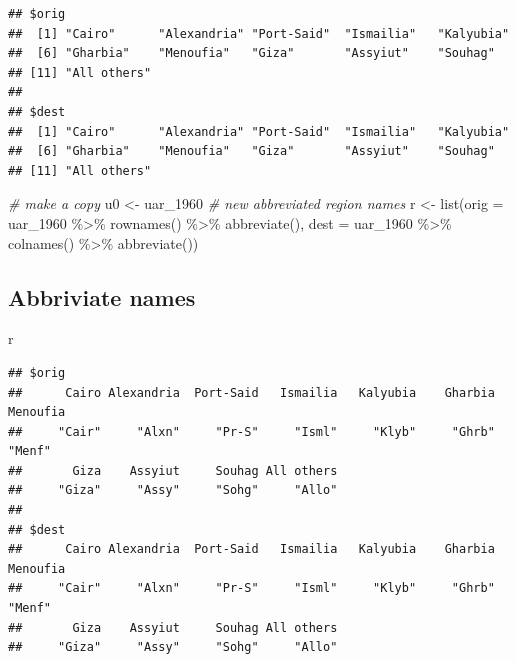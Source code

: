 \documentclass[
]{book}
\newenvironment{Shaded}{\begin{snugshade}}{\end{snugshade}}
\newcommand{\AttributeTok}[1]{\textcolor[rgb]{0.77,0.63,0.00}{#1}}
\newcommand{\CommentTok}[1]{\textcolor[rgb]{0.56,0.35,0.01}{\textit{#1}}}
\newcommand{\FunctionTok}[1]{\textcolor[rgb]{0.00,0.00,0.00}{#1}}
\newcommand{\NormalTok}[1]{#1}
\newcommand{\OtherTok}[1]{\textcolor[rgb]{0.56,0.35,0.01}{#1}}
\newcommand{\SpecialCharTok}[1]{\textcolor[rgb]{0.00,0.00,0.00}{#1}}
\begin{document}
\begin{verbatim}
## $orig
##  [1] "Cairo"      "Alexandria" "Port-Said"  "Ismailia"   "Kalyubia"  
##  [6] "Gharbia"    "Menoufia"   "Giza"       "Assyiut"    "Souhag"    
## [11] "All others"
## 
## $dest
##  [1] "Cairo"      "Alexandria" "Port-Said"  "Ismailia"   "Kalyubia"  
##  [6] "Gharbia"    "Menoufia"   "Giza"       "Assyiut"    "Souhag"    
## [11] "All others"
\end{verbatim}

\begin{Shaded}
\begin{Highlighting}[]
\CommentTok{\# make a copy}
\NormalTok{u0 }\OtherTok{\textless{}{-}}\NormalTok{ uar\_1960}
\CommentTok{\# new abbreviated region names}
\NormalTok{r }\OtherTok{\textless{}{-}} \FunctionTok{list}\NormalTok{(}\AttributeTok{orig =}\NormalTok{ uar\_1960 }\SpecialCharTok{\%\textgreater{}\%}
            \FunctionTok{rownames}\NormalTok{() }\SpecialCharTok{\%\textgreater{}\%}
            \FunctionTok{abbreviate}\NormalTok{(),}
          \AttributeTok{dest =}\NormalTok{ uar\_1960 }\SpecialCharTok{\%\textgreater{}\%}
            \FunctionTok{colnames}\NormalTok{() }\SpecialCharTok{\%\textgreater{}\%}
            \FunctionTok{abbreviate}\NormalTok{())}
\end{Highlighting}
\end{Shaded}

\hypertarget{abbriviate-names-1}{%
\subsection{Abbriviate names}\label{abbriviate-names-1}}

\begin{Shaded}
\begin{Highlighting}[]
\NormalTok{r}
\end{Highlighting}
\end{Shaded}

\begin{verbatim}
## $orig
##      Cairo Alexandria  Port-Said   Ismailia   Kalyubia    Gharbia   Menoufia 
##     "Cair"     "Alxn"     "Pr-S"     "Isml"     "Klyb"     "Ghrb"     "Menf" 
##       Giza    Assyiut     Souhag All others 
##     "Giza"     "Assy"     "Sohg"     "Allo" 
## 
## $dest
##      Cairo Alexandria  Port-Said   Ismailia   Kalyubia    Gharbia   Menoufia 
##     "Cair"     "Alxn"     "Pr-S"     "Isml"     "Klyb"     "Ghrb"     "Menf" 
##       Giza    Assyiut     Souhag All others 
##     "Giza"     "Assy"     "Sohg"     "Allo"
\end{verbatim}
\end{document}
